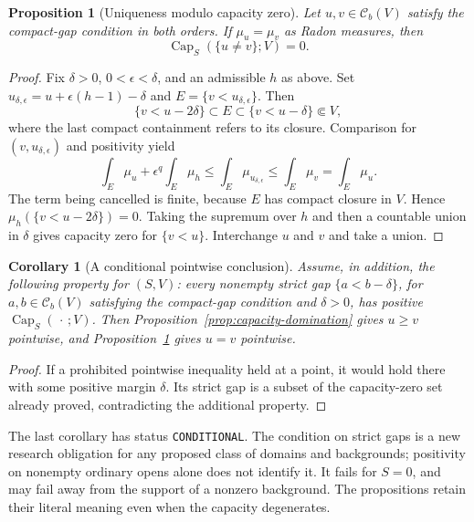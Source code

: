 \documentclass[11pt,a4paper]{article}
\numberwithin{equation}{section}
\newtheorem{proposition}[theorem]{Proposition}
\newtheorem{corollary}[theorem]{Corollary}
\theoremstyle{definition}
\theoremstyle{remark}
\newcommand{\Cb}{\mathcal C_b}
\begin{document}
\begin{proposition}[Uniqueness modulo capacity zero]
\label{prop:capacity-uniqueness}
Let $u,v\in\Cb(V)$ satisfy the compact-gap condition in both orders.
If $\mu_u=\mu_v$ as Radon measures, then
\[
 \operatorname{Cap}_S(\{u\ne v\};V)=0.
\]
\end{proposition}

\begin{proof}
Fix $\delta>0$, $0<\epsilon<\delta$, and an admissible $h$ as above.
Set $u_{\delta,\epsilon}=u+\epsilon(h-1)-\delta$ and
$E=\{v<u_{\delta,\epsilon}\}$. Then
\[
 \{v<u-2\delta\}\subset E\subset\{v<u-\delta\}\Subset V,
\]
where the last compact containment refers to its closure. Comparison
for $(v,u_{\delta,\epsilon})$ and positivity yield
\[
 \int_E\mu_u+\epsilon^q\int_E\mu_h
 \leq\int_E\mu_{u_{\delta,\epsilon}}
 \leq\int_E\mu_v=\int_E\mu_u.
\]
The term being cancelled is finite, because $E$ has compact closure
in $V$. Hence $\mu_h(\{v<u-2\delta\})=0$. Taking the supremum
over $h$ and then a countable union in $\delta$ gives capacity zero
for $\{v<u\}$. Interchange $u$ and $v$ and take a union.
\end{proof}

\begin{corollary}[A conditional pointwise conclusion]
\label{cor:conditional-pointwise-domination}
Assume, in addition, the following property for $(S,V)$: every
nonempty strict gap $\{a<b-\delta\}$, for $a,b\in\Cb(V)$ satisfying
the compact-gap condition and $\delta>0$, has positive
$\operatorname{Cap}_S(\,\cdot\,;V)$. Then
Proposition~\ref{prop:capacity-domination} gives $u\geq v$
pointwise, and Proposition~\ref{prop:capacity-uniqueness} gives
$u=v$ pointwise.
\end{corollary}

\begin{proof}
If a prohibited pointwise inequality held at a point, it would hold
there with some positive margin $\delta$. Its strict gap is a subset
of the capacity-zero set already proved, contradicting the additional
property.
\end{proof}

The last corollary has status \texttt{CONDITIONAL}. The condition on
strict gaps is a new research obligation for any proposed class of
domains and backgrounds; positivity on nonempty ordinary opens alone
does not identify it. It fails for $S=0$, and may fail away from the
support of a nonzero background. The propositions retain their literal
meaning even when the capacity degenerates.
\end{document}
